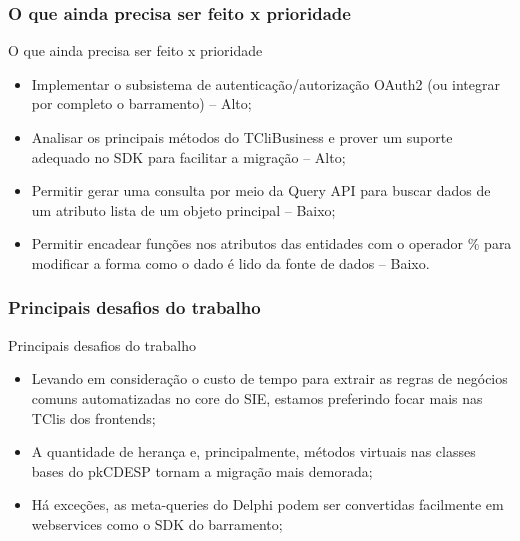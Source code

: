 \documentclass{beamer}
\begin{document}
\begin{frame}
\frametitle{O que ainda precisa ser feito x prioridade}

\begin{exampleblock}{O que ainda precisa ser feito x prioridade}
	
	\begin{itemize}
		\item<1->Implementar o subsistema de autenticação/autorização OAuth2 (ou integrar por completo o barramento) -- Alto;
		\item<1->Analisar os principais métodos do TCliBusiness e prover um suporte adequado no SDK para facilitar a migração -- Alto;
		\item<1->Permitir gerar uma consulta por meio da Query API para buscar dados de um atributo lista de um objeto principal -- Baixo;
		\item<1->Permitir encadear funções nos atributos das entidades com o operador \% para modificar a forma como o dado é lido da fonte de dados -- Baixo.
		
		
	\end{itemize}
	
\end{exampleblock}







\end{frame}


\begin{frame}
\frametitle{Principais desafios do trabalho}

\begin{exampleblock}{Principais desafios do trabalho}
	\small{
	\begin{itemize}
		\item<1->Levando em consideração o custo de tempo para extrair as regras de negócios comuns automatizadas no core do SIE, estamos preferindo focar mais nas TClis dos frontends;
		\item<1->A quantidade de herança e, principalmente, métodos virtuais nas classes bases do pkCDESP tornam a migração mais demorada;
		\item<1->Há exceções, as meta-queries do Delphi podem ser convertidas facilmente em webservices como o SDK do barramento;
	\end{itemize}
}
\end{exampleblock}

\end{frame}
\end{document}

